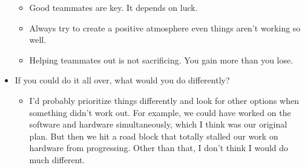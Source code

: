 \documentclass[compsoc,draftclsnofoot,onecolumn,10pt]{IEEEtran}
\begin{document}
\begin{itemize}
\begin{itemize}
      \item Good teammates are key. It depends on luck.
      \item Always try to create a positive atmosphere even things aren't
      working so well.
      \item Helping teammates out is not sacrificing. You gain more than you
      lose.
    \end{itemize}
    \item If you could do it all over, what would you do differently?
    \begin{itemize}
      \item I'd probably prioritize things differently and look for other options
      when something didn't work out. For example, we could have worked on the
      software and hardware simultaneously, which I think was our original plan.
      But then we hit a road block that totally stalled our work on hardware from
      progressing. Other than that, I don't think I would do much different.
    \end{itemize}
\end{itemize}
\end{document}
